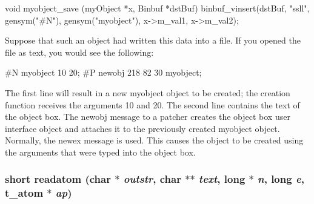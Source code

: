 \begin{DoxyCode}
    void myobject_save (myObject *x, Binbuf *dstBuf) 
    { 
        binbuf_vinsert(dstBuf, "ssll", gensym("#N"), 
            gensym("myobject"), 
            x->m_val1, x->m_val2); 
    }
\end{DoxyCode}


Suppose that such an object had written this data into a file. If you opened the file as text, you would see the following:


\begin{DoxyCode}
    #N myobject 10 20; 
    #P newobj 218 82 30 myobject; 
\end{DoxyCode}


The first line will result in a new myobject object to be created; the creation function receives the arguments 10 and 20. The second line contains the text of the object box. The newobj message to a patcher creates the object box user interface object and attaches it to the previously created myobject object. Normally, the newex message is used. This causes the object to be created using the arguments that were typed into the object box. \hypertarget{group__binbuf_gacb42118a4da090a6d47954f8b299de46}{
\subsubsection[{readatom}]{\setlength{\rightskip}{0pt plus 5cm}short readatom (char $\ast$ {\em outstr}, \/  char $\ast$$\ast$ {\em text}, \/  long $\ast$ {\em n}, \/  long {\em e}, \/  {\bf t\_\-atom} $\ast$ {\em ap})}}
\label{group__binbuf_gacb42118a4da090a6d47954f8b299de46}


